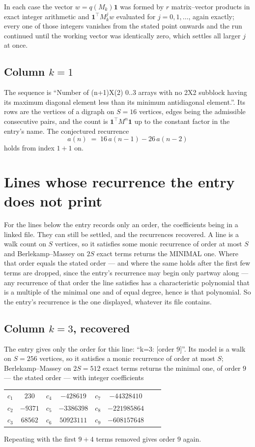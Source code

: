 \documentclass[11pt,a4paper]{article}
\theoremstyle{plain}
\theoremstyle{definition}
\begin{document}
In each case the vector $w=q(M_k)\mathbf{1}$ was formed by $r$ matrix--vector products in
exact integer arithmetic and $\mathbf{1}^{\!\top}M_k^{j}w$ evaluated for $j=0,1,\dots$,
again exactly; every one of those integers vanishes from the stated point onwards and the run
continued until the working vector was identically zero, which settles all larger $j$ at once.

\subsection*{Column $k$$=1$}
The sequence is ``Number of (n+1)X(2) 0..3 arrays with no 2X2 subblock having its maximum diagonal element less than its minimum antidiagonal element.''. Its rows are the vertices of a digraph on
$S=16$ vertices, edges being the admissible consecutive pairs, and the count is
$\mathbf{1}^{\!\top}M^{n}\mathbf{1}$ up to the constant factor in the entry's name.
The conjectured recurrence
\[
a(n)\;=\;16\,a(n-1) - 26\,a(n-2)
\]
holds from index $1+1$ on.


\section{Lines whose recurrence the entry does not print}

For the lines below the entry records only an order, the coefficients being in a linked file.
They can still be settled, and the recurrences recovered. A line is a walk count on $S$
vertices, so it satisfies some monic recurrence of order at most $S$ and Berlekamp--Massey on
$2S$ exact terms returns the MINIMAL one. Where that order equals the stated order --- and
where the same holds after the first few terms are dropped, since the entry's recurrence may
begin only partway along --- any recurrence of that order the line satisfies has a
characteristic polynomial that is a multiple of the minimal one and of equal degree, hence is
that polynomial. So the entry's recurrence is the one displayed, whatever its file contains.

\subsection*{Column $k=3$, recovered}
The entry gives only the order for this line: ``k=3: [order 9]''. Its model is a walk on
$S=256$ vertices, so it satisfies a monic recurrence of order at most $S$;
Berlekamp--Massey on $2S=512$ exact terms returns the minimal one, of order
$9$ --- the stated order --- with integer coefficients
\begin{center}\small\begin{tabular}{cccccccc}
$c_{1}$ & $230$ & $c_{4}$ & $-428619$ & $c_{7}$ & $-44328410$ &  &  \\
$c_{2}$ & $-9371$ & $c_{5}$ & $-3386398$ & $c_{8}$ & $-221985864$ &  &  \\
$c_{3}$ & $68562$ & $c_{6}$ & $50923111$ & $c_{9}$ & $-608157648$ &  &  \\
\end{tabular}\end{center}
Repeating with the first $9+4$ terms removed gives order $9$ again.
\end{document}
